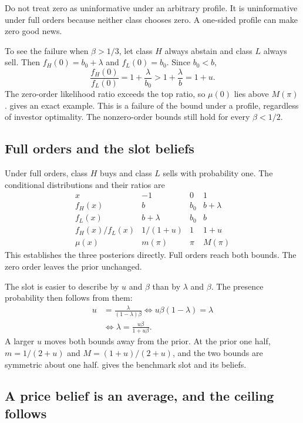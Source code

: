 \begin{caution}
Do not treat zero as uninformative under an arbitrary profile.
It is uninformative under full orders because neither class chooses zero.
A one-sided profile can make zero good news.
\end{caution}

To see the failure when $\beta>1/3$, let class $H$ always abstain and class $L$ always sell.
Then $f_H(0)=b_0+\lambda$ and $f_L(0)=b_0$.
Since $b_0<b$,
\[
\frac{f_H(0)}{f_L(0)}=1+\frac{\lambda}{b_0}>1+\frac{\lambda}{b}=1+u.
\]
The zero-order likelihood ratio exceeds the top ratio, so $\mu(0)$ lies above $M(\pi)$.
 gives an exact example.
This is a failure of the bound under a profile, regardless of investor optimality.
The nonzero-order bounds still hold for every $\beta<1/2$.

\subsection{Full orders and the slot beliefs}
\label{sec:04_slot_beliefs-full}

Under full orders, class $H$ buys and class $L$ sells with probability one.
The conditional distributions and their ratios are
\[
\begin{array}{c|ccc}
x&-1&0&1\\ \hline
f_H(x)&b&b_0&b+\lambda\\
f_L(x)&b+\lambda&b_0&b\\
f_H(x)/f_L(x)&1/(1+u)&1&1+u\\
\mu(x)&m(\pi)&\pi&M(\pi)
\end{array}
\]
This establishes the three posteriors directly. 
Full orders reach both bounds.
The zero order leaves the prior unchanged.

The slot is easier to describe by $u$ and $\beta$ than by $\lambda$ and $\beta$.
The presence probability then follows from them:
\begin{align*}
u&=\frac{\lambda}{(1-\lambda)\beta}
\iff u\beta(1-\lambda)=\lambda\\
&\iff \lambda=\frac{u\beta}{1+u\beta}.
\end{align*}
A larger $u$ moves both bounds away from the prior.
At the prior one half, $m=1/(2+u)$ and $M=(1+u)/(2+u)$, and the two bounds are symmetric about one half.
 gives the benchmark slot and its beliefs.

\subsection{A price belief is an average, and the ceiling follows}
\label{sec:04_slot_beliefs-ceiling}

